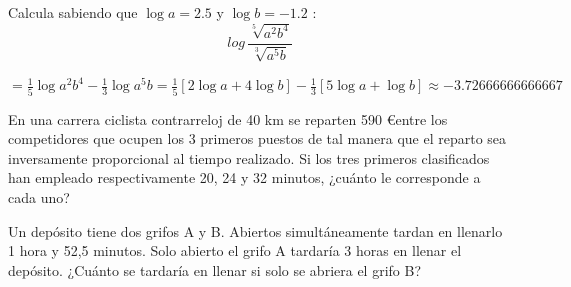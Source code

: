 \documentclass[addpoints,spanish, 12pt,a4paper]{exam}
\begin{document}
\begin{questions}
\addpoints




\question[1] Calcula sabiendo que $\log a = 2.5$ y $\log b = -1.2$ :
 \[log\,\frac{\sqrt[5]{{a^2}{b^4}}  }{\sqrt[3]{{a^5}b} }\]
\begin{solution}
$=\frac{1}{5}\log {a^2b^4} - \frac{1}{3}\log {a^5b}=\frac{1}{5}\left[2\log a + 4\log b \right]-\frac{1}{3}\left[5\log a +\log b \right]\approx-3.72666666666667$
\end{solution}


\addpoints



\question[2] En una carrera ciclista contrarreloj de 40 km se reparten 590 \euro entre los competidores que ocupen los 3 primeros puestos de tal manera que el reparto sea inversamente proporcional al tiempo realizado. Si los tres primeros clasificados han empleado respectivamente 20, 24 y 32 minutos, ¿cuánto le corresponde a cada uno?


\question[2] Un depósito tiene dos grifos A y B. Abiertos simultáneamente tardan en llenarlo 1 hora y 52,5 minutos. Solo abierto el grifo A tardaría 3 horas en llenar el depósito. ¿Cuánto se tardaría en llenar si solo se abriera el grifo B?



 


\end{questions}
\end{document}
